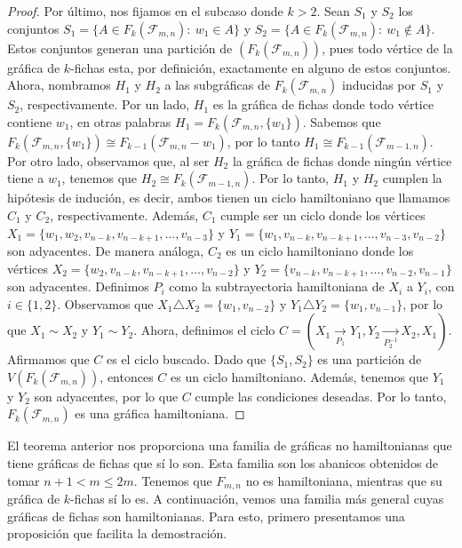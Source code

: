\begin{proof}
    Por \'ultimo, nos fijamos en el subcaso donde $k>2$. Sean $S_1$ y $S_2$ los
    conjuntos $S_1=\{A \in F_k(\mathcal{F}_{m,n}) \colon\ w_1 \in A\}$ y
    $S_2=\{A \in F_k(\mathcal{F}_{m,n}) \colon\ w_1 \notin A\}$. Estos conjuntos
    generan una partici\'on de $(F_k(\mathcal{F}_{m,n}))$, pues todo v\'ertice
    de la gr\'afica de $k$-fichas esta, por definici\'on, exactamente en alguno
    de estos conjuntos. Ahora, nombramos $H_1$ y $H_2$ a las subgr\'aficas de
    $F_k(\mathcal{F}_{m,n})$ inducidas por $S_1$ y $S_2$, respectivamente. Por
    un lado, $H_1$ es la gr\'afica de fichas donde todo v\'ertice contiene
    $w_1$, en otras palabras $H_1= F_k(\mathcal{F}_{m,n},\{w_1\})$. Sabemos que
    $F_k(\mathcal{F}_{m,n},\{w_1\}) \cong F_{k-1}(\mathcal{F}_{m,n}- w_1)$, por
    lo tanto $H_1 \cong F_{k-1}(\mathcal{F}_{m-1,n})$. Por otro lado, observamos
    que, al ser $H_2$ la gr\'afica de fichas donde ning\'un v\'ertice tiene a
    $w_1$, tenemos que $H_2 \cong F_k(\mathcal{F}_{m-1,n})$. Por lo tanto, $H_1$
    y $H_2$ cumplen la hip\'otesis de induci\'on, es decir, ambos tienen un
    ciclo hamiltoniano que llamamos $C_1$ y $C_2$, respectivamente. Adem\'as,
    $C_1$ cumple ser un ciclo donde los v\'ertices $X_1 = \{w_1,
    w_2,v_{n-k},v_{n-k+1}, \dots, v_{n-3}\}$ y $Y_1 = \{w_1,v_{n-k},v_{n-k+1},
    \dots, v_{n-3},v_{n-2}\}$ son adyacentes. De manera an\'aloga, $C_2$ es un
    ciclo hamiltoniano donde los v\'ertices $X_2 = \{ w_2,v_{n-k},v_{n-k+1},
    \dots, v_{n-2}\}$ y $Y_2 = \{v_{n-k},v_{n-k+1}, \dots, v_{n-2},v_{n-1}\}$
    son adyacentes. Definimos $P_i$ como la subtrayectoria hamiltoniana de $X_i$
    a $Y_i$, con $i \in \{ 1,2 \}$. Observamos que $X_1 \triangle X_2 =
    \{w_1,v_{n-2}\}$ y $Y_1 \triangle Y_2 = \{w_1, v_{n-1}\}$, por lo que $X_1
    \sim X_2$ y $Y_1 \sim Y_2$. Ahora, definimos el ciclo $C = (X_1
    \xrightarrow[P_1]{}Y_1,Y_2 \xrightarrow[P_2^{-1}]{}X_2,X_1)$. Afirmamos que
    $C$ es el ciclo buscado. Dado que $\{S_1,S_2\}$ es una partici\'on de
    $V(F_k(\mathcal{F}_{m,n}))$, entonces $C$ es un ciclo hamiltoniano.
    Adem\'as, tenemos que $Y_1$ y $Y_2$ son adyacentes, por lo que $C$ cumple
    las condiciones deseadas. Por lo tanto, $F_k(\mathcal{F}_{m,n})$ es una
    gr\'afica hamiltoniana.
\end{proof}

El teorema anterior nos proporciona una familia de gr\'aficas no hamiltonianas
que tiene gr\'aficas de fichas que s\'i lo son. Esta familia son los abanicos
obtenidos de tomar $n+1 < m \leq 2m$. Tenemos que $F_{m,n}$ no es hamiltoniana,
mientras que su gr\'afica de $k$-fichas s\'i lo es. A continuaci\'on, vemos una
familia m\'as general cuyas gr\'aficas de fichas son hamiltonianas. Para esto,
primero presentamos una proposici\'on que facilita la demostraci\'on.

